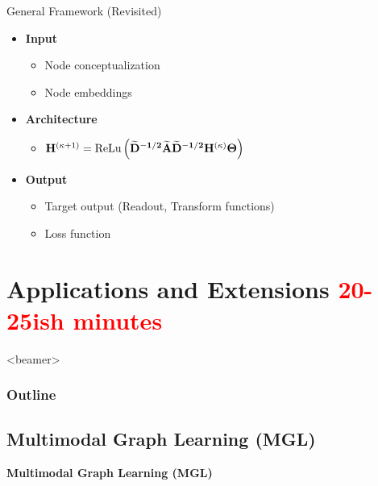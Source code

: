 \documentclass{beamer}
\newcommand{\OutlineRedux}
{
  \begin{frame}<beamer>
    \frametitle{Outline}
    \tableofcontents[currentsection]
  \end{frame}
}
\newcommand{\NodeRepMat}{\mathbf{H}}
\newcommand{\DegMat}{\mathbf{D}}
\newcommand{\iter}{\kappa}
\newcommand{\AdjMat}{\mathbf{A}}
\newcommand{\ReLu}{\text{ReLu}}
\begin{document}
\begin{frame}{General Framework (Revisited)}
    \begin{itemize}\setlength\itemsep{8mm}
        \item {\bf Input} 
            \begin{itemize}
                \item Node conceptualization
                \item Node embeddings
            \end{itemize}
        \item {\bf Architecture}
            \begin{itemize}
                \item $\NodeRepMat^{(\iter+1)} 
                =
                \ReLu
                \left( 
                    \mathbf{
                    \widetilde{\DegMat}^{-1/2}
                    \widetilde{\AdjMat}
                    \widetilde{\DegMat}^{-1/2}  
                    \NodeRepMat^{(\iter)}
                    \Theta 
                    }            
                \right)$
            \end{itemize}
        \item {\bf Output}
            \begin{itemize}
                \item Target output (Readout, Transform functions)
                \item Loss function
            \end{itemize}
\end{itemize}
\end{frame}




\section{Applications and Extensions \textcolor{red}{20-25ish minutes}}
\OutlineRedux



\subsection{Multimodal Graph Learning (MGL)}

\begin{frame}{}
    \bf{\Large Multimodal Graph Learning (MGL)}    
\end{frame}
\end{document}
